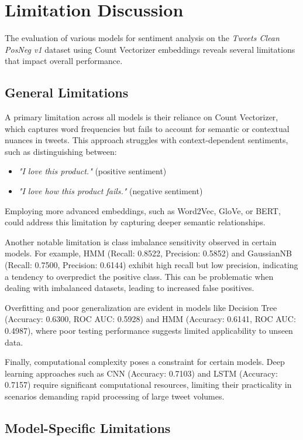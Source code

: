 \section{Limitation Discussion}

The evaluation of various models for sentiment analysis on the \textit{Tweets Clean PosNeg v1} dataset using Count Vectorizer embeddings reveals several limitations that impact overall performance.

\subsection{General Limitations}
A primary limitation across all models is their reliance on Count Vectorizer, which captures word frequencies but fails to account for semantic or contextual nuances in tweets. This approach struggles with context-dependent sentiments, such as distinguishing between:

\begin{itemize}
    \item \textit{"I love this product."} (positive sentiment)
    \item \textit{"I love how this product fails."} (negative sentiment)
\end{itemize}

Employing more advanced embeddings, such as Word2Vec, GloVe, or BERT, could address this limitation by capturing deeper semantic relationships.

Another notable limitation is class imbalance sensitivity observed in certain models. For example, HMM (Recall: 0.8522, Precision: 0.5852) and GaussianNB (Recall: 0.7500, Precision: 0.6144) exhibit high recall but low precision, indicating a tendency to overpredict the positive class. This can be problematic when dealing with imbalanced datasets, leading to increased false positives.

Overfitting and poor generalization are evident in models like Decision Tree (Accuracy: 0.6300, ROC AUC: 0.5928) and HMM (Accuracy: 0.6141, ROC AUC: 0.4987), where poor testing performance suggests limited applicability to unseen data.

Finally, computational complexity poses a constraint for certain models. Deep learning approaches such as CNN (Accuracy: 0.7103) and LSTM (Accuracy: 0.7157) require significant computational resources, limiting their practicality in scenarios demanding rapid processing of large tweet volumes.

\subsection{Model-Specific Limitations}

